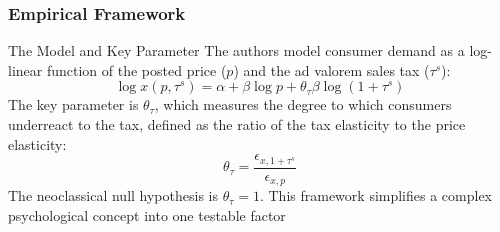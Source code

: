 \documentclass{beamer}
\begin{document}
\begin{frame}
\frametitle{Empirical Framework}

\begin{block}{The Model and Key Parameter}
The authors model consumer demand as a log-linear function of the posted price ($p$) and the ad valorem sales tax ($\tau^s$):
\begin{equation}
    \log x(p, \tau^s) = \alpha + \beta \log p + \theta_{\tau}\beta \log(1+\tau^s) \nonumber
\end{equation}
The key parameter is $\theta_{\tau}$, which measures the degree to which consumers underreact to the tax, defined as the ratio of the tax elasticity to the price elasticity:
\begin{equation}
    \theta_{\tau} = \frac{\epsilon_{x,1+\tau^s}}{\epsilon_{x,p}} \nonumber
\end{equation}
The neoclassical null hypothesis is $\theta_{\tau} = 1$. This framework simplifies a complex psychological concept into one testable factor
\end{block}

\begin{center}
\end{center}

\end{frame}
\end{document}
